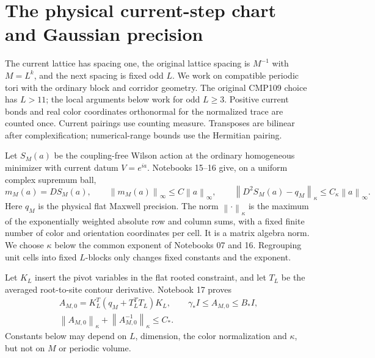 \documentclass[11pt]{article}
\newcommand{\norm}[1]{\left\|#1\right\|}
\begin{document}
\section{The physical current-step chart and Gaussian precision}
\label{pc-section}

The current lattice has spacing one, the original lattice spacing
is $M^{-1}$ with $M=L^k$, and the next spacing is fixed odd $L$.
We work on compatible periodic tori with the ordinary block and
corridor geometry. The original CMP109 choice has $L>11$; the
local arguments below work for odd $L\ge3$. Positive current bonds
and real color coordinates orthonormal for the normalized trace
are counted once. Current pairings use counting measure.
Transposes are bilinear after complexification; numerical-range
bounds use the Hermitian pairing.

Let $S_M(a)$ be the coupling-free Wilson action at the ordinary
homogeneous minimizer with current datum $V=e^{ia}$. Notebooks
15--16 give, on a uniform complex supremum ball,
\begin{equation}\label{pc-classical-input}
 m_M(a)=DS_M(a),\qquad
 \norm{m_M(a)}_\infty\le C\norm a_\infty,\qquad
 \norm{D^2S_M(a)-q_M}_\kappa\le C_\kappa\norm a_\infty.
\end{equation}
Here $q_M$ is the physical flat Maxwell precision. The norm
$\norm{\cdot}_\kappa$ is the maximum of the exponentially weighted
absolute row and column sums, with a fixed finite number of
color and orientation coordinates per cell. It is a matrix
algebra norm. We choose $\kappa$ below the common exponent of
Notebooks 07 and 16. Regrouping unit cells into fixed $L$-blocks
only changes fixed constants and the exponent.

Let $K_L$ insert the pivot variables in the flat rooted constraint,
and let $T_L$ be the averaged root-to-site contour derivative.
Notebook 17 proves
\begin{equation}\label{pc-flat-input}
 \begin{gathered}
 A_{M,0}=K_L^T(q_M+T_L^TT_L)K_L,\qquad
 \gamma_*I\le A_{M,0}\le B_*I,\\
 \norm{A_{M,0}}_\kappa+\norm{A_{M,0}^{-1}}_\kappa\le C_*.
 \end{gathered}
\end{equation}
Constants below may depend on $L$, dimension, the color
normalization and $\kappa$, but not on $M$ or periodic volume.
\end{document}
